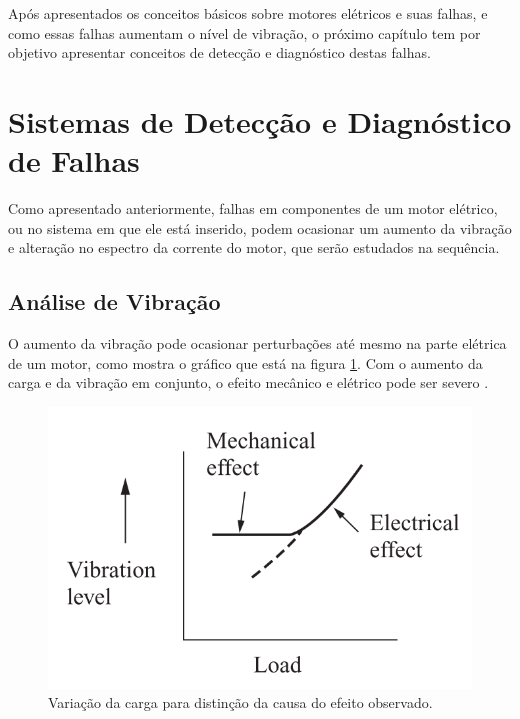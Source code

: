 Após apresentados os conceitos básicos sobre motores elétricos e suas falhas, e como essas falhas aumentam o nível de vibração,
o próximo capítulo tem por objetivo apresentar conceitos de detecção e diagnóstico destas falhas.


% 

\section{Sistemas de Detecção e Diagnóstico de Falhas}\label{sec:}

Como apresentado anteriormente, falhas em componentes de um motor elétrico, ou no sistema em que ele está inserido, podem ocasionar
um aumento da vibração e alteração no espectro da corrente do motor, que serão estudados na sequência.


% 

\subsection{Análise de Vibração}\label{subsec:}

O aumento da vibração pode ocasionar perturbações até mesmo na parte elétrica de um motor, como mostra o gráfico que está na 
figura \ref{fig:fault_effect_randall_p54}. Com o aumento da carga e da vibração em conjunto, o efeito mecânico e elétrico pode ser 
severo .

\begin{figure}[H]
    \caption{Variação da carga para distinção da causa do efeito observado.}
    \begin{center}
        \includegraphics[scale=.45]{referencial/img/fault_effect_randall_p54.png}
    \end{center}
    \label{fig:fault_effect_randall_p54}
\end{figure}


